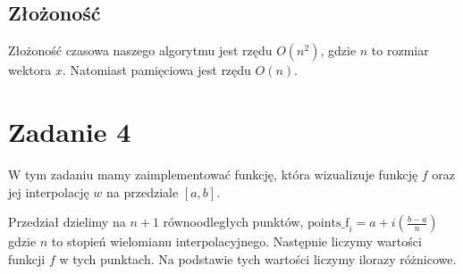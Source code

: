 \documentclass{article}
\begin{document}
\begin{algorithm}[H]
    \SetAlgoLined
    
\end{algorithm}

\subsection*{Złożoność}
Złożoność czasowa naszego algorytmu jest rzędu $O(n^2)$, gdzie $n$ to rozmiar wektora $x$.
Natomiast pamięciowa jest rzędu $O(n)$.

\section*{Zadanie 4}
W tym zadaniu mamy zaimplementować funkcję, która wizualizuje
funkcję $f$ oraz jej interpolację $w$ na przedziale $[a, b]$.

Przedział dzielimy na $n+1$ równoodległych punktów,
$\text{points\_f}_i = a+i(\frac{b-a}{n})$ gdzie $n$ to stopień
wielomianu interpolacyjnego. Następnie liczymy wartości funkcji $f$ w tych
punktach. Na podstawie tych wartości liczymy ilorazy różnicowe.
\end{document}

